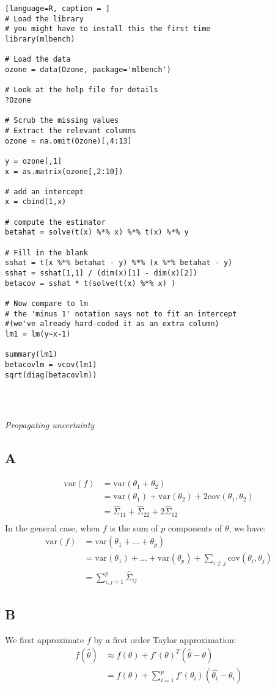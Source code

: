 \documentclass{article}
\begin{document}
\begin{lstlisting}[language=R, caption = ]
# Load the library
# you might have to install this the first time
library(mlbench)

# Load the data
ozone = data(Ozone, package='mlbench')

# Look at the help file for details
?Ozone

# Scrub the missing values
# Extract the relevant columns 
ozone = na.omit(Ozone)[,4:13]

y = ozone[,1]
x = as.matrix(ozone[,2:10])

# add an intercept
x = cbind(1,x)

# compute the estimator
betahat = solve(t(x) %*% x) %*% t(x) %*% y

# Fill in the blank
sshat = t(x %*% betahat - y) %*% (x %*% betahat - y)
sshat = sshat[1,1] / (dim(x)[1] - dim(x)[2])
betacov = sshat * t(solve(t(x) %*% x) )

# Now compare to lm
# the 'minus 1' notation says not to fit an intercept
#(we've already hard-coded it as an extra column)
lm1 = lm(y~x-1)

summary(lm1)
betacovlm = vcov(lm1)
sqrt(diag(betacovlm))




\end{lstlisting}


\textit{Propagating uncertainty}
\subsection*{A}

\begin{align*}
\mbox{var}(f) &= \mbox{var}(\theta_1 + \theta_2)\\
&= \mbox{var}(\theta_1) + \mbox{var}(\theta_2) + 2\mbox{cov}(\theta_1, \theta_2)\\
&= \hat{\Sigma}_{11} + \hat{\Sigma}_{22} + 2\hat{\Sigma}_{12}\\
\end{align*}
In the general case, when \(f\) is the sum of \(p\) components of \(\theta\), we have:
\begin{align*}
\mbox{var}(f) &= \mbox{var}(\theta_1 + \ldots + \theta_p)\\
&= \mbox{var}(\theta_1) + \dots + \mbox{var}(\theta_p) + \sum_{i\neq j}\mbox{cov}(\theta_i, \theta_j)\\
&= \sum_{i,j = 1}^p \hat{\Sigma}_{ij}
\end{align*}


\subsection*{B}
We first approximate \(f\) by a first order Taylor approximation:
\begin{align*}
f(\hat{\theta}) &\approx f(\theta) + f'(\theta)^T(\hat{\theta} - \theta)\\
&= f(\theta) + \sum_{i=1}^p f'(\theta_i) (\hat{\theta_i} - \theta_i)
\end{align*}
\end{document}
